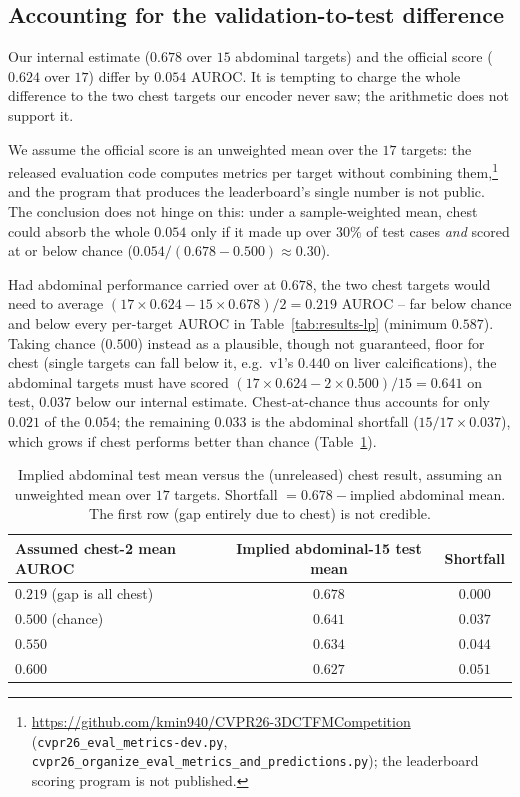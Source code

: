 \documentclass[runningheads]{llncs}
\begin{document}
\subsection{Accounting for the validation-to-test difference}
\label{sec:valtest}
Our internal estimate ($0.678$ over $15$ abdominal targets) and the official
score ($0.624$ over $17$) differ by $0.054$ AUROC. It is tempting to charge the
whole difference to the two chest targets our encoder never saw; the arithmetic
does not support it.

We assume the official score is an unweighted mean over the $17$ targets: the
released evaluation code computes metrics per target without combining
them,\footnote{\url{https://github.com/kmin940/CVPR26-3DCTFMCompetition}
(\nolinkurl{cvpr26_eval_metrics-dev.py},
\nolinkurl{cvpr26_organize_eval_metrics_and_predictions.py}); the leaderboard
scoring program is not published.} and the program that produces the
leaderboard's single number is not public. The conclusion does not hinge on this:
under a sample-weighted mean, chest could absorb the whole $0.054$ only if it made
up over $30\%$ of test cases \emph{and} scored at or below chance
($0.054/(0.678-0.500)\approx0.30$).

Had abdominal performance carried over at $0.678$, the two chest targets would
need to average $(17{\times}0.624 - 15{\times}0.678)/2 = 0.219$ AUROC -- far below
chance and below every per-target AUROC in Table~\ref{tab:results-lp} (minimum
$0.587$). Taking chance ($0.500$) instead as a plausible, though not guaranteed,
floor for chest (single targets can fall below it, e.g.\ v1's $0.440$ on liver
calcifications), the abdominal targets must have scored
$(17{\times}0.624 - 2{\times}0.500)/15 = 0.641$ on test, $0.037$ below our
internal estimate. Chest-at-chance thus accounts for only $0.021$ of the
$0.054$; the remaining $0.033$ is the abdominal shortfall ($15/17\times0.037$),
which grows if chest performs better than chance (Table~\ref{tab:gap}).

\begin{table}[htbp]
\caption{Implied abdominal test mean versus the (unreleased) chest result,
assuming an unweighted mean over $17$ targets. Shortfall $=0.678-{}$implied
abdominal mean. The first row (gap entirely due to chest) is not credible.}
\label{tab:gap}
\centering
\begin{tabular}{lcc}
\hline
Assumed chest-2 mean AUROC & Implied abdominal-15 test mean & Shortfall \\ \hline
$0.219$ (gap is all chest) & $0.678$ & $0.000$ \\
$0.500$ (chance)           & $0.641$ & $0.037$ \\
$0.550$                    & $0.634$ & $0.044$ \\
$0.600$                    & $0.627$ & $0.051$ \\ \hline
\end{tabular}
\end{table}
\end{document}
